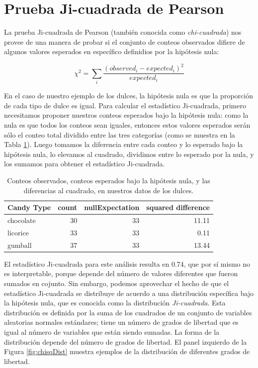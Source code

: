 \documentclass[
  12pt,
]{book}
\begin{document}
\hypertarget{chi-squared-test}{%
\section{Prueba Ji-cuadrada de Pearson}\label{chi-squared-test}}

La prueba Ji-cuadrada de Pearson (también conocida como \emph{chi-cuadrada}) nos provee de una manera de probar si el conjunto de conteos observados difiere de algunos valores esperados en específico definidios por la hipótesis nula:

\[
\chi^2 = \sum_i\frac{(observed_i - expected_i)^2}{expected_i}
\]

En el caso de nuestro ejemplo de los dulces, la hipótesis nula es que la proporción de cada tipo de dulce es igual. Para calcular el estadístico Ji-cuadrada, primero necesitamos proponer nuestros conteos esperados bajo la hipótesis nula: como la nula es que todos los conteos sean iguales, entonces estos valores esperados serán sólo el conteo total dividido entre las tres categorías (como se muestra en la Tabla \ref{tab:candyDf}). Luego tomamos la diferencia entre cada conteo y lo esperado bajo la hipótesis nula, lo elevamos al cuadrado, dividimos entre lo esperado por la nula, y los sumamos para obtener el estadístico Ji-cuadrada.

\begin{table}

\caption{\label{tab:candyDf}Conteos observados, conteos esperados bajo la hipótesis nula, y las diferencias al cuadrado, en nuestros datos de los dulces.}
\centering
\begin{tabular}[t]{l|r|r|r}
\hline
Candy Type & count & nullExpectation & squared difference\\
\hline
chocolate & 30 & 33 & 11.11\\
\hline
licorice & 33 & 33 & 0.11\\
\hline
gumball & 37 & 33 & 13.44\\
\hline
\end{tabular}
\end{table}

El estadístico Ji-cuadrada para este análisis resulta en 0.74, que por sí mismo no es interpretable, porque depende del número de valores diferentes que fueron sumados en cojunto. Sin embargo, podemos aprovechar el hecho de que el estadístico Ji-cuadrada se distribuye de acuerdo a una distribución específica bajo la hipótesis nula, que es conocida como la distribución \emph{Ji-cuadrada}. Esta distribución es definida por la suma de los cuadrados de un conjunto de variables aleatorias normales estándares; tiene un número de grados de libertad que es igual al número de variables que están siendo sumadas. La forma de la distribución depende del número de grados de libertad. El panel izquierdo de la Figura \ref{fig:chisqDist} muestra ejemplos de la distribución de diferentes grados de libertad.
\end{document}
